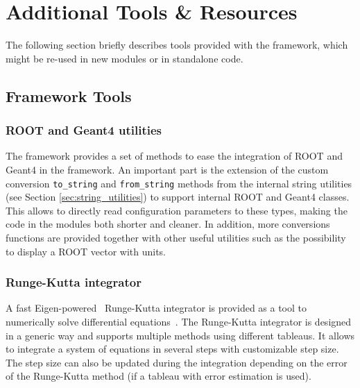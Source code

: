 \chapter{Additional Tools \& Resources}
\label{sec:additional_tools_resources}

The following section briefly describes tools provided with the \apsq framework, which might be re-used in new modules or in standalone code.

\section{Framework Tools}
\subsection{ROOT and Geant4 utilities}
\label{sec:root_and_geant4_utilities}
The framework provides a set of methods to ease the integration of ROOT and Geant4 in the framework.
An important part is the extension of the custom conversion \texttt{to\_string} and \texttt{from\_string} methods from the internal string utilities (see Section \ref{sec:string_utilities}) to support internal ROOT and Geant4 classes.
This allows to directly read configuration parameters to these types, making the code in the modules both shorter and cleaner.
In addition, more conversions functions are provided together with other useful utilities such as the possibility to display a ROOT vector with units.

\subsection{Runge-Kutta integrator}
A fast Eigen-powered~\cite{eigen3} Runge-Kutta integrator is provided as a tool to numerically solve differential equations~\cite{fehlberg}.
The Runge-Kutta integrator is designed in a generic way and supports multiple methods using different tableaus.
It allows to integrate a system of equations in several steps with customizable step size.
The step size can also be updated during the integration depending on the error of the Runge-Kutta method (if a tableau with error estimation is used).

\label{sec:tcad_electric_field_converter}

\label{sec:root_analysis_macros}

